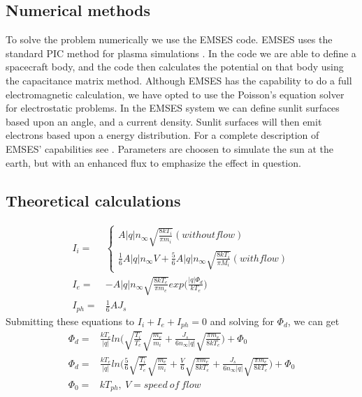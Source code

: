 \subsection{Numerical methods}

To solve the problem numerically we use the EMSES code. EMSES uses the standard PIC method for plasma simulations \citep{birdsall2004plasma}.
In the code we are able to define a spacecraft body, and the code then calculates the potential on that body using the capacitance matrix method.
Although EMSES has the capability to do a full electromagnetic calculation, we have opted to use the Poisson's equation
solver for electrostatic problems. In the EMSES system we can define sunlit surfaces based upon an angle, and a current
density. Sunlit surfaces will then emit electrons based upon a energy distribution. For a complete description of EMSES' capabilities
see \citep{nakashima_ohhelp:_2009}. Parameters are choosen to simulate the sun at the earth, but with an enhanced flux to emphasize the effect in question.

\subsection{Theoretical calculations}
\label{sec:theo_calc}

\begin{equation}
\begin{split}
 I_i = &
    \left\{\begin{array}{ccc}
       A|q|n_\infty\sqrt{\frac{8 k T_i}{\pi m_i}} (without flow)\\
       \frac{1}{6}A |q|n_\infty V + \frac{5}{6} A |q| n_\infty \sqrt{\frac{8 k T_i}{\pi M_i}}(with flow)
      \end{array}\right. \\
  I_e = & -A|q|n_\infty \sqrt{\frac{8 k T_e}{\pi m_e}}exp\Big(\frac{|q|\Phi_d}{k T_e}\Big)\\
  I_{ph} = & \frac{1}{6} AJ_s
\end{split}
\label{thin sheet potential}
\end{equation}
Submitting these equations to \(I_i+I_e+I_{ph}=0\) and solving for $\Phi_d$, we can get
\begin{equation}
\begin{split}
 \Phi_d = & \frac{k T_e}{|q|}ln\Big(\sqrt{\frac{T_i}{T_e}}\sqrt{\frac{m_e}{m_i}}+\frac{J_s}{6 n_\infty |q|}\sqrt{\frac{\pi m_e}{8 k T_e}}\Big) + \Phi_0 \\
 \Phi_d = & \frac{k T_e}{|q|}ln\Big(\frac{5}{6}\sqrt{\frac{T_i}{T_e}}\sqrt{\frac{m_e}{m_i}}+\frac{V}{6}\sqrt{\frac{\pi m_e}{8 k T_e}} + \frac{J_s}{6 n_\infty |q|}\sqrt{\frac{\pi m_e}{8 k T_e}} \Big)+\Phi_0 \\
 \Phi_0 = & k T_{ph}, \ V = speed\ of\ flow
\end{split}
\label{thin sheet potential 2}
\end{equation}

